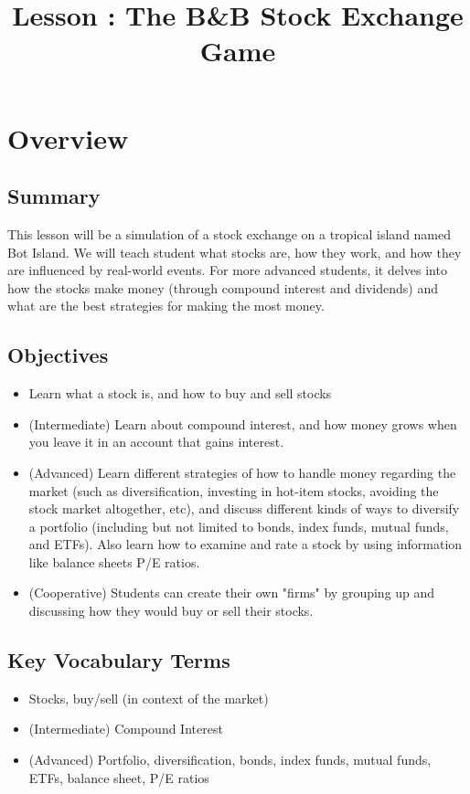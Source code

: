 \documentclass{lessonplan}
\title{Lesson \lessonNumber: The B\&B Stock Exchange Game}
\author{\linkHome}
\date{}
\begin{document}
  \maketitle

  \section{Overview}
    \subsection{Summary}
      This lesson will be a simulation of a stock exchange on a tropical island named Bot Island. 
      We will teach student what stocks are, how they work, and how they are influenced by real-world events.
      For more advanced students, it delves into how the stocks make money (through compound interest and dividends)
      and what are the best strategies for making the most money.

    \subsection{Objectives}
    \begin{itemize}
      \item Learn what a stock is, and how to buy and sell stocks
      \item (Intermediate) Learn about compound interest, and how money grows when you leave it in 
                an account that gains interest. 
      \item (Advanced) Learn different strategies of how to handle money regarding the market (such as 
               diversification, investing in hot-item stocks, avoiding the stock market altogether, etc), and discuss 
               different kinds of ways to diversify a portfolio (including but not limited to bonds, index funds, 
               mutual funds, and ETFs). Also learn how to examine and rate a stock by using information like balance sheets P/E ratios.
      \item (Cooperative) Students can create their own "firms" by grouping up and discussing how they would buy or sell their stocks.
    \end{itemize}
    \subsection{Key Vocabulary Terms}
    \begin{itemize}
      \item Stocks, buy/sell (in context of the market)
      \item (Intermediate) Compound Interest
      \item (Advanced) Portfolio, diversification, bonds, index funds, mutual funds, ETFs, balance sheet, P/E ratios
    \end{itemize}
\end{document}
